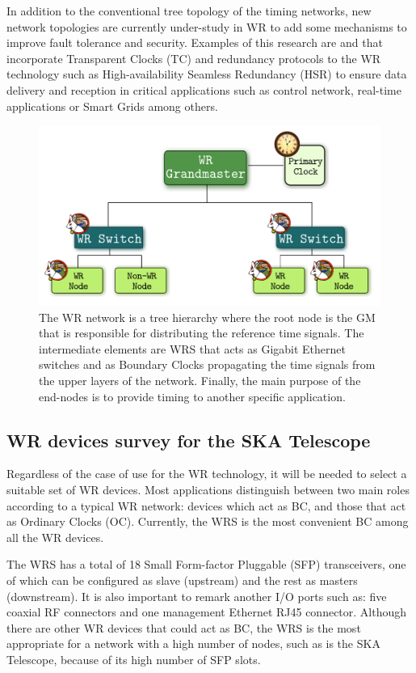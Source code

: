 In addition to the conventional tree topology of the timing networks, new
network topologies are currently under-study in WR to add some mechanisms to improve fault
tolerance and security. Examples of this research are
\cite{jlgutierrez-paper-redundancy} and \cite{jlgutierrezhsr} that incorporate Transparent Clocks
(TC) and redundancy protocols to the WR technology such as
High-availability Seamless Redundancy (HSR) to ensure data delivery and reception in critical applications such as
control network, real-time applications or Smart Grids among others.

\begin{figure}[H] \centering \includegraphics[scale=0.4]{img/wr_hierarchy}
	\caption{The WR network is a tree hierarchy where the root node is the
	GM that is responsible for distributing the reference time signals. The intermediate elements are WRS that acts as Gigabit Ethernet switches and as Boundary Clocks propagating the time signals from the upper layers of the network. Finally, the main purpose of the end-nodes
	is to provide timing to another specific application.}
\label{fig:wr_hierarchy} \end{figure}

\subsection{WR devices survey for the SKA Telescope} \label{subsec:wr-dev}

Regardless of the case of use for the WR technology, it will be needed to select
a suitable set of WR devices. Most applications distinguish between two main roles
according to a typical WR network: devices which act as BC, and those that act as
Ordinary Clocks (OC). Currently, the WRS \cite{ohwr:wrs} is the most convenient
BC among all the WR devices. 

The WRS has a total of 18 Small Form-factor Pluggable (SFP) transceivers, one of which can be configured as slave (upstream) and the rest as masters (downstream). It is also important to remark another I/O ports such as: five coaxial RF connectors and one management Ethernet RJ45 connector. Although there are other WR devices that could act as BC, the WRS is the most appropriate for a network with a high number of nodes, such as is the SKA Telescope, because of its high number of SFP slots.

